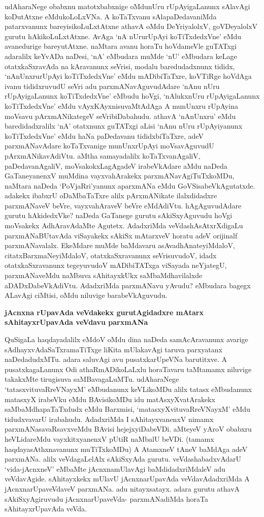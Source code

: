 udAharaNege obabxnu matotxbabxnige oMdunUru rUpAyigaLanunx sAlavAgi koDutAtxne eMdukoLoLxVNa. A koTaTxvanu sAlapaDedavaniMda patarxvanunx bareyisikoLuLxtAtxne athavA oMdu DeYriyalolxV, goVDeyalolxV gurutu hAkikoLuLxtAtxne. AvAga `nA nUrurUpAyi koTiTxdedxVne' eMdu avanedurige bareyutAtxne. naMtara avanu horaTu hoVdameVle guTATxgi adaralilx keYvADa naDesi, `nA' eMbudara muMde `nU' eMbudara keLage otatxkaSxravAda na kAravanunx seVrisi, modalu baredudadxnunx tididx, `nAnUnxrurUpAyi koTiTxdedxVne' eMdu mADibiTaTxre, koVTiRge hoVdAga ivanu tididxruvudU seVri adu parxmANavAguvudAdare `nAnu nUru rUpAyigaLanunx koTiTxdedxVne' eMbudu hoVgi, `nAlukxnUru rUpAyigaLanunx koTiTxdedxVne' eMdu vAyxKAyxnisuvaMtAdAga A munUnxru rUpAyina moVsavu pArxmANikategeV seVribiDabahudu. athavA `nAnUnxru' eMdu baredidadxralilx `nA' otatxnunx guTATxgi aLisi `nAnu nUru rUpAyiyanunx koTiTxdedxVne' eMdu haNa paDedavanu tididxbiTaTxre, adeV parxmANavAdare koTaTxvanige munUnxrUpAyi moVsavAguvudU pArxmANikavAdiVtu. aMtha samayadalilx koTaTxvanAgaliV, paDedavanAgaliV, moVsakokxLagAgadeV irabeVkAdare aMdu naDeda GaTaneyanenxV muMdina vayxvahArakekx parxmANavAgiTuTxkoMDu, naMtara naDeda `PoVjaRri'yanunx aparxmANa eMdu GoVSisabeVkAgutatxde. adakekx ibabxrU oDaMbaTaTxre alilx pArxmANikate ilalxdidadxre parxmANaveV beVre, vayxvahAraveV beVre eMdAdiVtu. hAgAguvudAdare gurutu hAkidedxVke? naDeda GaTanege gurutu sAkiSxyAguvudu hoVgi moVsakekx AdhAravAdaMte Agutetx. AdadxriMda veVdashAsAtxrXdigaLu parxmANaBUtavAda viSayakekx sAkiSx mAtarxveV horatu adeV orijinalf parxmANavalalx. EkeMdare muMde baMdavaru asAvadhAnateyiMdaloV, citatxBarxmaNeyiMdaloV, otatxkaSxravanunx seVrisuvudoV, idadx otatxkaSxravanunx tegeyuvudoV mADibiTATxga viSayada neYjategU, parxmANaveMdu naMbuva sAhitayxkUkx saMbaMdhavilalxde aDADxDabeVkAdiVtu. AdadxriMda parxmANavu yAvudu? eMbudara bagegx ALavAgi ciMtisi, oMdu niluvige barabeVkAguvudu.

{\bigskip
\noindent
{\large\bf jAcnxna rUpavAda veVdakekx gurutAgidadxre mAtarx sAhitayxrUpavAda veVdavu parxmANa}}\label{page137}
\medskip

\noindent
QuSigaLa haqdayadalilx eMdoV oMdu dina naDeda samAcAravanunx avarige sAdhayxvAdaSaTxramaTiTxge liKita mUlakavAgi taruva parxyatanx naDedadudxMTu. adara saluvAgi avu pusatxkarUpeVNa barutitxve. A pusatxkagaLanunx Odi athaRmADikoLaLxlu horaTavaru taMtamamx niluvige takakxMte tirugisuva saMBavagaLuMTu. udAharaNege `tatasxvituvaRreVNayxM' eMbudanunx keVLikoMDu alilx tatasx eMbudanunx matasxyX irabeVku eMdu BAvisikoMDu idu matAsxyXvatArakekx saMbaMdhapaTaTxdudx eMdu Barxmisi, `matasxyXvituvaRreVNayxM' eMdu tidudxvavarU irabahudu. AdadxriMda I sAhitayxvanenxV nimamx parxmANasavaRsavxveMdu BAvisi hejejxyiDabeVDi. aMteyeV yAroV obabxru heVLidareMdu vayxkitxyanenxV pUtiR naMbalU beVDi. (tamamx haqdayasAthxnavanunx muTiTxkoMDu) A AtamxneV tAneV baMdAga adeV parxmANa. alilx veVdagaLelAlx sAkiSxyAda gurutu. veVdashabadxvAdarU `vida-jAcnxneV' eMbaMte jAcnxnamUlavAgi baMdidadxriMdaleV adu veVdavAgide. sAhitayxkekx mUlavU jAcnxnarUpavAda veVdavAdadxriMda A jAcnxnarUpaveVdaveV parxmANa. adu nitayxsatayx. adara gurutu athavA sAkiSxyAgiruvudu jAcnxnarUpaveVda- parxmANadiMda horaTa sAhitayxrUpavAda veVda.

